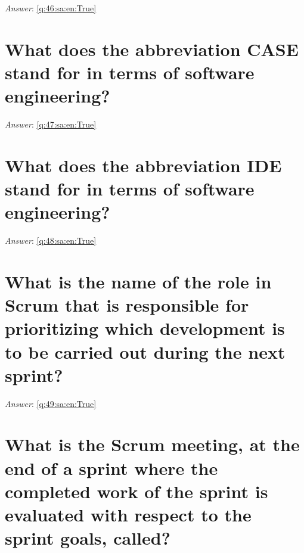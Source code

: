 \documentclass[a4paper,11pt,oneside]{book}
\begin{document}
\begin{sloppypar}
\vspace{1cm}

\textit{Answer}: \autoref{q:46:sa:en:True}



\section{What does the abbreviation CASE stand for in terms of software engineering?}

\label{q:47:sa:en:False}

\vspace{2cm}

\noindent\makebox[\textwidth]{\hrulefill}

\vspace{1cm}

\textit{Answer}: \autoref{q:47:sa:en:True}



\section{What does the abbreviation IDE stand for in terms of software engineering?}

\label{q:48:sa:en:False}

\vspace{2cm}

\noindent\makebox[\textwidth]{\hrulefill}

\vspace{1cm}

\textit{Answer}: \autoref{q:48:sa:en:True}



\section{What is the name of the role in Scrum that is responsible for prioritizing which development is to be carried out during the next sprint?}

\label{q:49:sa:en:False}

\vspace{2cm}

\noindent\makebox[\textwidth]{\hrulefill}

\vspace{1cm}

\textit{Answer}: \autoref{q:49:sa:en:True}



\section{What is the Scrum meeting, at the end of a sprint where the completed work of the sprint is evaluated with respect to the sprint goals, called?}


\end{sloppypar}
\end{document}
